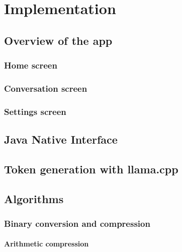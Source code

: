 
\chapter{Implementation}\label{ch:implementation}
\glsresetall %

\section{Overview of the app}
\label{sec:overviewOfTheApp}

\subsection{Home screen}
\label{sec:homeScreen}

\subsection{Conversation screen}
\label{sec:conversationScreen}

\subsection{Settings screen}
\label{sec:settingsScreen}

\section{Java Native Interface}
\label{sec:jni}

\section{Token generation with llama.cpp}
\label{sec:tokenGenerationWithLlamaCpp}

\section{Algorithms}
\label{sec:algorithms}

\subsection{Binary conversion and compression}
\label{sec:binaryConversionAndCompression}

\subsubsection{Arithmetic compression}
\label{sec:arithmeticCompression}

